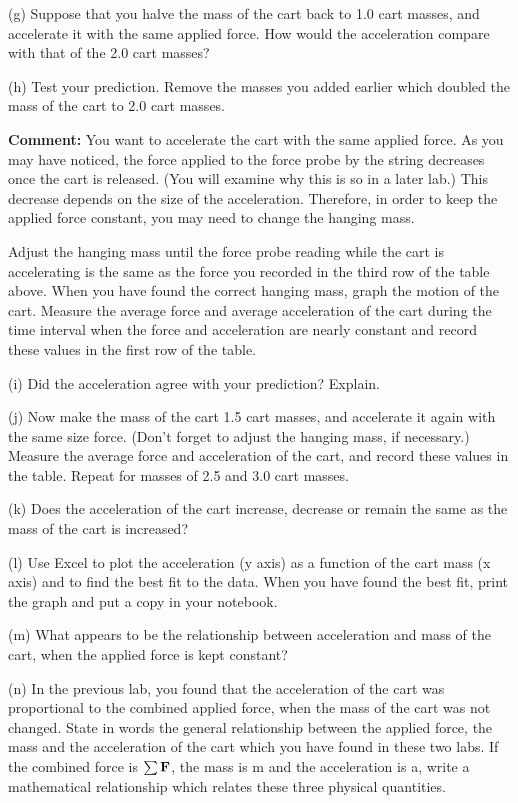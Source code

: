 (g) Suppose that you halve the mass of the cart back to 1.0 cart masses, and
accelerate it with the same applied force. How would the acceleration compare
with that of the 2.0 cart masses?
\vspace{20mm}

(h) Test your prediction. Remove the masses you added earlier which doubled
the mass of the cart to 2.0 cart masses. 

\textbf{Comment:} You want to accelerate the cart with the same applied force.
As you may have noticed, the force applied to the force probe by the string
decreases once the cart is released. (You will examine why this is so in a later
lab.) This decrease depends on the size of the acceleration. Therefore, in order
to keep the applied force constant, you may need to change the hanging mass. 

Adjust the hanging mass until the force probe reading while the cart is accelerating
is the same as the force you recorded in the third row of the table above. When
you have found the correct hanging mass, graph the motion of the cart. Measure
the average force and average acceleration of the cart during the time interval
when the force and acceleration are nearly constant and record these values
in the first row of the table.

(i) Did the acceleration agree with your prediction? Explain.
\vspace{20mm}

(j) Now make the mass of the cart 1.5 cart masses, and accelerate it again with
the same size force. (Don't forget to adjust the hanging mass, if necessary.)
Measure the average force and acceleration of the cart, and record these values
in the table. Repeat for masses of 2.5 and 3.0 cart masses.

(k) Does the acceleration of the cart increase, decrease or remain the same
as the mass of the cart is increased?
\vspace{10mm}

(l) Use Excel to plot the acceleration (y axis) as a function of the
cart mass (x axis) and to find the best fit to the data. When you have found
the best fit, print the graph and put a copy in your notebook. 

(m) What appears to be the relationship between acceleration and mass of the
cart, when the applied force is kept constant?
\vspace{20mm}

(n) In the previous lab, you found that the acceleration of the cart was proportional
to the combined applied force, when the mass of the cart was not changed. State
in words the general relationship between the applied force, the mass and the
acceleration of the cart which you have found in these two labs. If the combined
force is \( \sum{\bf F}  \), the mass is m and the acceleration is a,
write a mathematical relationship which relates these three physical quantities.
\vspace{20mm}


